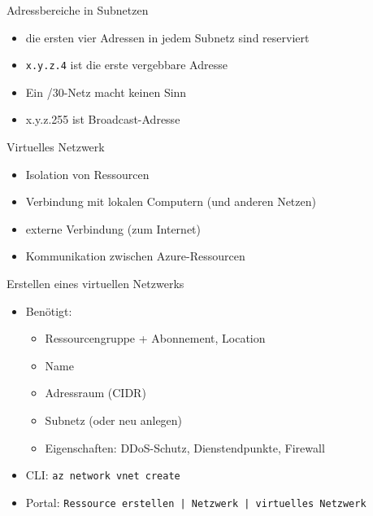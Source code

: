 \begin{flashcard}[Definition]{Adressbereiche in Subnetzen}
    \begin{itemize}
        \item die ersten vier Adressen in jedem Subnetz sind reserviert
        \item[$\Rightarrow$] \texttt{x.y.z.4} ist die erste vergebbare Adresse
        \item[$\Rightarrow$] Ein /30-Netz macht keinen Sinn
        \item x.y.z.255 ist Broadcast-Adresse
    \end{itemize}
\end{flashcard}


\begin{flashcard}[Definition]{Virtuelles Netzwerk}
    \begin{itemize}
        \item Isolation von Ressourcen
        \item Verbindung mit lokalen Computern (und anderen Netzen)
        \item externe Verbindung (zum Internet)
        \item Kommunikation zwischen Azure-Ressourcen
    \end{itemize}
\end{flashcard}

\begin{flashcard}[Definition]{Erstellen eines virtuellen Netzwerks}
    \begin{itemize}
        \item Benötigt:
        \begin{itemize}
            \item Ressourcengruppe + Abonnement, Location
            \item Name
            \item Adressraum (CIDR)
            \item Subnetz (oder neu anlegen)
            \item Eigenschaften: DDoS-Schutz, Dienstendpunkte, Firewall
        \end{itemize}
        \item CLI: \texttt{az network vnet create}
        \item Portal: \texttt{Ressource erstellen | Netzwerk | virtuelles Netzwerk}
    \end{itemize}
\end{flashcard}

